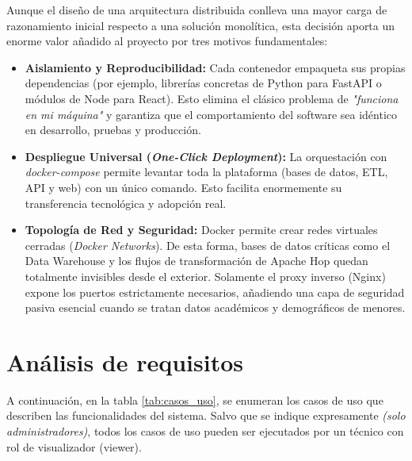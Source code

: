 Aunque el diseño de una arquitectura distribuida conlleva una mayor carga de razonamiento inicial respecto a una solución monolítica, esta decisión aporta un enorme valor añadido al proyecto por tres motivos fundamentales:

\begin{itemize}
    \item \textbf{Aislamiento y Reproducibilidad:} Cada contenedor empaqueta sus propias dependencias (por ejemplo, librerías concretas de Python para FastAPI o módulos de Node para React). Esto elimina el clásico problema de \textit{"funciona en mi máquina"} y garantiza que el comportamiento del software sea idéntico en desarrollo, pruebas y producción.
    \item \textbf{Despliegue Universal (\textit{One-Click Deployment}):} La orquestación con \textit{docker-compose} permite levantar toda la plataforma (bases de datos, ETL, API y web) con un único comando. Esto facilita enormemente su transferencia tecnológica y adopción real.
    \item \textbf{Topología de Red y Seguridad:} Docker permite crear redes virtuales cerradas (\textit{Docker Networks}). De esta forma, bases de datos críticas como el Data Warehouse y los flujos de transformación de Apache Hop quedan totalmente invisibles desde el exterior. Solamente el proxy inverso (Nginx) expone los puertos estrictamente necesarios, añadiendo una capa de seguridad pasiva esencial cuando se tratan datos académicos y demográficos de menores.
\end{itemize}

\section{Análisis de requisitos}

A continuación, en la tabla \ref{tab:casos_uso}, se enumeran los casos de uso que describen las funcionalidades del sistema. Salvo que se indique expresamente \textit{(solo administradores)}, todos los casos de uso pueden ser ejecutados por un técnico con rol de visualizador (viewer).

\small
\renewcommand{\arraystretch}{1.1}

